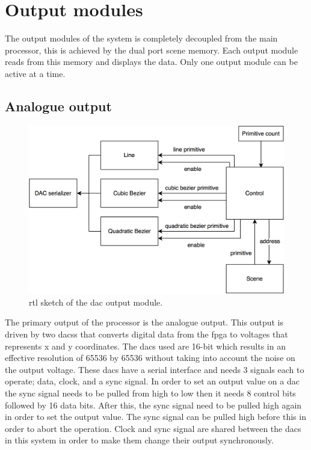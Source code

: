 \chapter{Output modules}
\label{chap:Output}

The output modules of the system is completely decoupled from the main processor, this is achieved by the dual port scene memory.
Each output module reads from this memory and displays the data.
Only one output module can be active at a time.

\section{Analogue output}

\begin{figure}[h!]
    \includegraphics[width=\linewidth]{images/dac-output.png}
    \caption{\gls{rtl} sketch of the \vthreek \gls{dac} output module.}
    \label{fig:dac-output}
\end{figure}

The primary output of the processor is the analogue output.
This output is driven by two \gls{dacs}s that converts digital data from the \gls{fpga} to voltages that represents x and y coordinates.
The \gls{dac}s used are 16-bit which results in an effective resolution of 65536 by 65536 without taking into account the noise on the output voltage.
These \gls{dac}s have a serial interface and needs 3 signals each to operate; data, clock, and a sync signal.
In order to set an output value on a \gls{dac} the sync signal needs to be pulled from high to low then it needs 8 control bits followed by 16 data bits.
After this, the sync signal need to be pulled high again in order to set the output value.
The sync signal can be pulled high before this in order to abort the operation.
Clock and sync signal are shared between the \gls{dac}s in this system in order to make them change their output synchronously.

